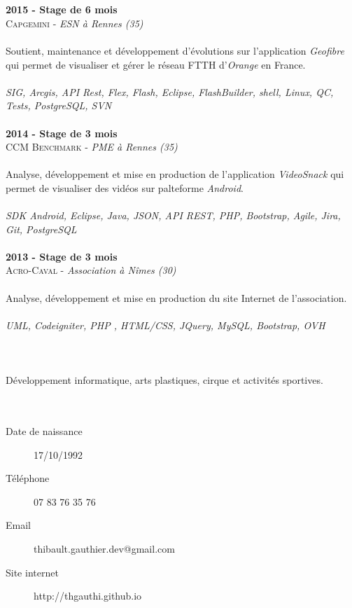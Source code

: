 \begin{titlepage}
\begin{minipage}[t]{8.7cm}
    \\\\
    \textbf{2015 - Stage de 6 mois} \\
    \textsc{Capgemini} -
    \textit{ESN à Rennes (35)}
    \\\\Soutient, maintenance et développement d'évolutions sur l'application \textit{Geofibre} qui permet de visualiser et gérer le réseau FTTH d'\textit{Orange} en France.
    \\\\\textit{SIG, Arcgis, API Rest, Flex, Flash, Eclipse, FlashBuilder, shell, Linux, QC, Tests, PostgreSQL, SVN}
    \\\\\textbf{2014 - Stage de 3 mois} \\
    \textsc{CCM Benchmark} -
     \textit{PME à Rennes (35)}
    \\\\Analyse, développement et mise en production de l'application \textit{VideoSnack} qui permet de visualiser des vidéos sur palteforme \textit{Android}.
    \\\\\textit{SDK Android, Eclipse, Java, JSON, API REST, PHP, Bootstrap, Agile, Jira, Git, PostgreSQL}
    \\\\\textbf{2013 - Stage de 3 mois} \\
    \textsc{Acro-Caval} -
    \textit{Association à Nîmes (30)}
    \\\\Analyse, développement et mise en production du site Internet de l'association.
    \\\\\textit{UML, Codeigniter, PHP , HTML/CSS, JQuery, MySQL, Bootstrap, OVH}
    \\\\\\\\
    Développement informatique, arts plastiques,
    cirque et activités sportives.
    \\\\\\
    \begin{description}%
      \item[Date de naissance] 17/10/1992
      \item[Téléphone] 07 83 76 35 76
      \item[Email] thibault.gauthier.dev@gmail.com
      \item[Site internet] http://thgauthi.github.io
    \end{description}


\end{minipage}
\end{titlepage}
